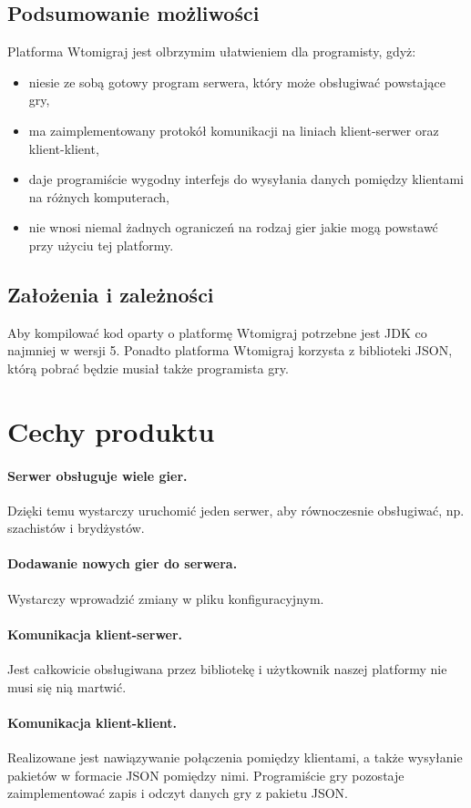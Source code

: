 \documentclass[a4paper, 12pt]{article}
\begin{document}
\subsection[Podsumowanie możliwości]{Podsumowanie możliwości}
Platforma Wtomigraj jest olbrzymim ułatwieniem dla programisty, gdyż:
\begin{itemize}
 \item niesie ze sobą gotowy program serwera, który może obsługiwać powstające gry,
 \item ma zaimplementowany protokół komunikacji na liniach klient-serwer oraz klient-klient,
 \item daje programiście wygodny interfejs do wysyłania danych pomiędzy klientami na różnych komputerach,
 \item nie wnosi niemal żadnych ograniczeń na rodzaj gier jakie mogą powstawć przy użyciu tej platformy.
\end{itemize}

\subsection[Założenia i zależności]{Założenia i zależności}
Aby kompilować kod oparty o platformę Wtomigraj potrzebne jest JDK co najmniej w wersji 5. Ponadto platforma Wtomigraj korzysta z biblioteki JSON, którą pobrać będzie musiał także programista gry.

\section[Cechy produktu]{Cechy produktu}
\paragraph{Serwer obsługuje wiele gier.} Dzięki temu wystarczy uruchomić jeden serwer, aby równoczesnie obsługiwać, np. szachistów i brydżystów.
\paragraph{Dodawanie nowych gier do serwera.} Wystarczy wprowadzić zmiany w pliku konfiguracyjnym.
\paragraph{Komunikacja klient-serwer.} Jest całkowicie obsługiwana przez bibliotekę i użytkownik naszej platformy nie musi się nią martwić.
\paragraph{Komunikacja klient-klient.} Realizowane jest nawiązywanie połączenia pomiędzy klientami, a także wysyłanie pakietów w formacie JSON pomiędzy nimi. Programiście gry pozostaje zaimplementować zapis i odczyt danych gry z pakietu JSON.
\end{document}
